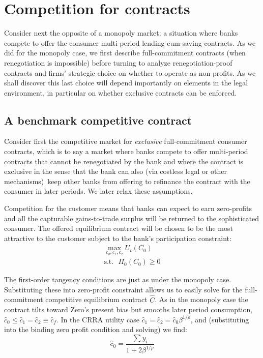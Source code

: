 \documentclass[11pt]{article}%
\begin{document}
\section{Competition for contracts}

Consider next the opposite of a monopoly market: a situation where banks compete to offer the consumer multi-period lending-cum-saving contracts.  As we did for the monopoly  case, we first describe full-commitment contracts (when renegotiation is impossible) before turning to analyze renegotiation-proof contracts and firms' strategic choice on whether to operate as non-profits. As we shall discover this last choice will depend importantly on elements in the legal environment, in particular on whether exclusive  contracts can be enforced.

\subsection{A benchmark competitive contract}

Consider first the competitive market for \emph{exclusive} full-commitment  consumer contracts, which is to say a market where banks compete to offer multi-period contracts that cannot be renegotiated by the bank and where the contract is exclusive in the sense that the bank can also (via costless legal or other mechanisms)\ keep other  banks from offering to refinance the contract with the consumer in later periods.  We later relax these assumptions. 

Competition for the customer means that banks can expect to earn zero-profits and all the capturable gains-to-trade surplus will be returned to
the sophisticated consumer.
The  offered equilibrium contract will be chosen to be the most attractive  to the customer subject to the bank's participation constraint:%
\begin{align*}
 \max_{c_{0},c_{1},c_{2}}U_{t}(  C_{0}) \\
 \text{s.t.}\text{ }\Pi_{0}(  C_{0})
\geq0
\end{align*}


The first-order tangency conditions are just as under the monopoly case. Substituting these into
zero-profit constraint allows us to easily solve for the full-commitment competitive equilibrium contract $\hat{C}$.  As in the monopoly case the contract  tilts toward Zero's present bias but smooths later period consumption, 
\(\hat{c}_{0}\leq\hat{c}_{1}=\hat{c}_{2}\equiv\hat{c}_{f}\). 
In the CRRA utility case    $\hat{c}_{1}=\hat{c}_{2}{}= \hat{c}_{0}\beta^{1/\rho}$, and (substituting into the binding zero profit condition and solving) we find: \begin{displaymath}
\hat{c}_{0} =\frac{\sum y_{i}}{1+2\beta^{1/\rho}}
\end{displaymath}
 
\end{document}
